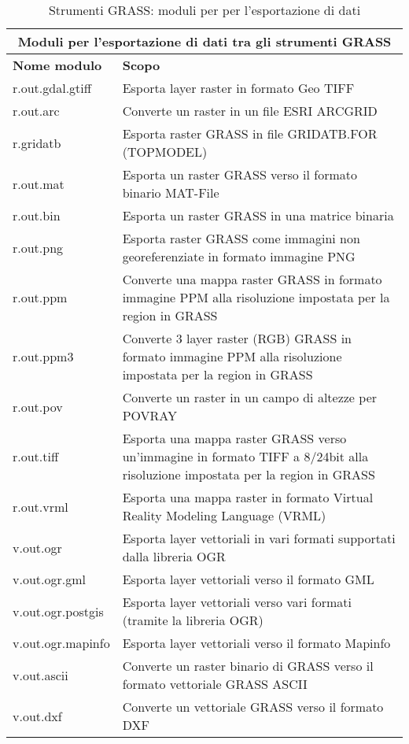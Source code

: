 \begin{table}[ht]
\centering
\caption{Strumenti GRASS: moduli per per l'esportazione di dati}\medskip
 \begin{tabular}{|p{4cm}|p{12cm}|}
  \hline \multicolumn{2}{|c|}{\textbf{Moduli per l'esportazione di dati tra gli strumenti GRASS}} \\ 
  \hline \textbf{Nome modulo} & \textbf{Scopo} \\
  \hline r.out.gdal.gtiff & Esporta layer raster in formato Geo TIFF \\
  \hline r.out.arc & Converte un raster in un file ESRI ARCGRID \\
  \hline r.gridatb & Esporta raster GRASS in file GRIDATB.FOR (TOPMODEL) \\
  \hline r.out.mat & Esporta un raster GRASS verso il formato binario MAT-File \\
  \hline r.out.bin & Esporta un raster GRASS in una matrice binaria \\
  \hline r.out.png & Esporta raster GRASS come immagini non georeferenziate in formato immagine PNG \\
  \hline r.out.ppm & Converte una mappa raster GRASS in formato immagine PPM alla risoluzione impostata per la region in GRASS \\
  \hline r.out.ppm3 & Converte 3 layer raster (RGB) GRASS in formato immagine PPM alla risoluzione impostata per la region in GRASS \\
  \hline r.out.pov & Converte un raster in un campo di altezze per POVRAY\\
  \hline r.out.tiff & Esporta una mappa raster GRASS verso un'immagine in formato TIFF a 8/24bit alla risoluzione impostata per la region in GRASS \\
  \hline r.out.vrml &  Esporta una mappa raster in formato Virtual Reality Modeling Language (VRML)\\
  \hline v.out.ogr & Esporta layer vettoriali in vari formati supportati dalla libreria OGR \\
  \hline v.out.ogr.gml & Esporta layer vettoriali verso il formato GML \\
  \hline v.out.ogr.postgis & Esporta layer vettoriali verso vari formati (tramite la libreria OGR) \\
  \hline v.out.ogr.mapinfo & Esporta layer vettoriali verso il formato Mapinfo \\
  \hline v.out.ascii & Converte un raster binario di GRASS verso il formato vettoriale GRASS ASCII  \\
  \hline v.out.dxf & Converte un vettoriale GRASS verso il formato DXF  \\
\hline
\end{tabular}
\end{table}

